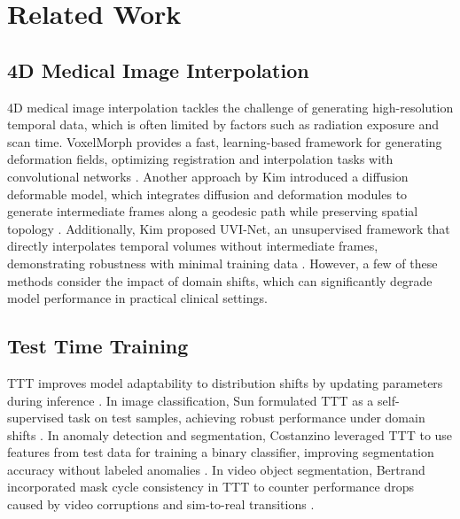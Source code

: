 \section{Related Work}
\subsection{4D Medical Image Interpolation}
4D medical image interpolation tackles the challenge of generating high-resolution temporal data, which is often limited by factors such as radiation exposure and scan time. VoxelMorph provides a fast, learning-based framework for generating deformation fields, optimizing registration and interpolation tasks with convolutional networks \cite{balakrishnan2019voxelmorph}. Another approach by Kim introduced a diffusion deformable model, which integrates diffusion and deformation modules to generate intermediate frames along a geodesic path while preserving spatial topology \cite{Kim2022DiffusionDM}. Additionally, Kim proposed UVI-Net, an unsupervised framework that directly interpolates temporal volumes without intermediate frames, demonstrating robustness with minimal training data \cite{kim2024data}. However, a few of these methods consider the impact of domain shifts, which can significantly degrade model performance in practical clinical settings.

\subsection{Test Time Training}
TTT improves model adaptability to distribution shifts by updating parameters during inference \cite{liang2024comprehensive}. In image classification, Sun formulated TTT as a self-supervised task on test samples, achieving robust performance under domain shifts \cite{sun2020test, sun2019unsupervised, gandelsman2022test}. In anomaly detection and segmentation, Costanzino leveraged TTT to use features from test data for training a binary classifier, improving segmentation accuracy without labeled anomalies \cite{Costanzino2024TestTT}. In video object segmentation, Bertrand incorporated mask cycle consistency in TTT to counter performance drops caused by video corruptions and sim-to-real transitions \cite{bertrand2023testtime}.
   

